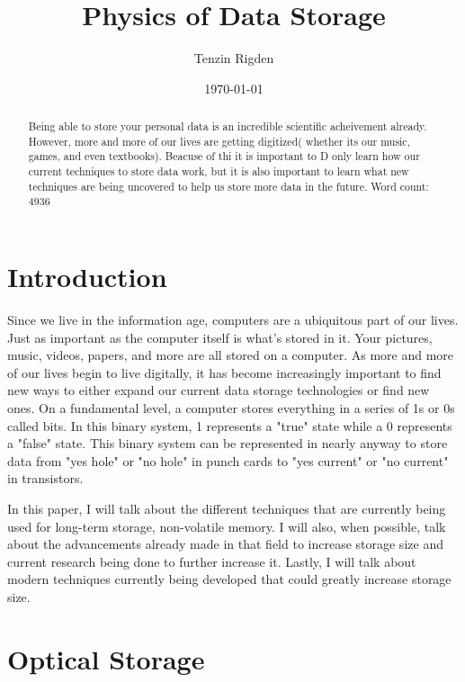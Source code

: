 \documentclass[ notitlepage, numerical, 11pt]{revtex4-1} %
\begin{document}
\title{Physics of Data Storage}
\author{Tenzin Rigden}
\date{\today}
\begin{abstract}
Being able to store your personal data is an incredible scientific acheivement already. However,  more and more of our lives are getting digitized( whether its our music, games, and even textbooks). Beacuse of thi it is important to D only learn how our current techniques to store data work, but it is also important to learn what new techniques are being uncovered to help us store more data in the future.
Word count: 4936
\end{abstract}

\maketitle
\section{Introduction}
Since we live in the information age, computers are a ubiquitous part of our lives. Just as important as the computer itself is what's stored in it. Your pictures, music, videos, papers, and more are all stored on a computer. As more and more of our lives begin to live digitally, it has become increasingly important to find new ways to either expand our current data storage technologies or find new ones. On a fundamental level, a computer stores everything in a series of 1s or 0s called bits. In this binary system, 1 represents a "true" state while a 0 represents a "false" state. This binary system can be represented in nearly anyway to store data from "yes hole" or "no hole" in punch cards to "yes current" or "no current" in transistors. 

In this paper, I will talk about the different techniques that are currently being used for long-term storage, non-volatile memory. I will also, when possible, talk about the advancements already made in that field to increase storage size and current research being done to further increase it. Lastly, I will talk about modern techniques currently being developed that could greatly increase storage size.



\section{Optical Storage}
\end{document}
